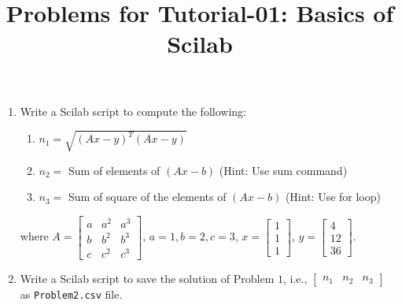 \documentclass[10pt,a4paper]{article}
\begin{document}
\title{Problems for Tutorial-01: Basics of Scilab}
\date{}
\maketitle
\begin{enumerate}
\item Write a Scilab script to compute the following:
\begin{enumerate}
\item $n_1 = \sqrt{(Ax - y)^T(Ax - y)}$
\item $n_2 = $ Sum of elements of $(Ax-b)$ (Hint: Use sum command)
\item $n_3 = $ Sum of square of the elements of $(Ax - b)$ (Hint: Use for loop)
\end{enumerate}
where $A = \begin{bmatrix}a & a^2 & a^3\\b & b^2 & b^3\\c & c^2 & c^3\end{bmatrix}$, 
$a = 1, b = 2, c = 3$, $x = \begin{bmatrix}1\\1\\1\end{bmatrix}$, 
$y = \begin{bmatrix}4\\12\\36\end{bmatrix}$.
\item Write a Scilab script to save the solution of Problem $1$, i.e., 
$\begin{bmatrix}n_1 & n_2 & n_3\end{bmatrix}$ as \verb'Problem2.csv' file.
\end{enumerate}
\end{document}
